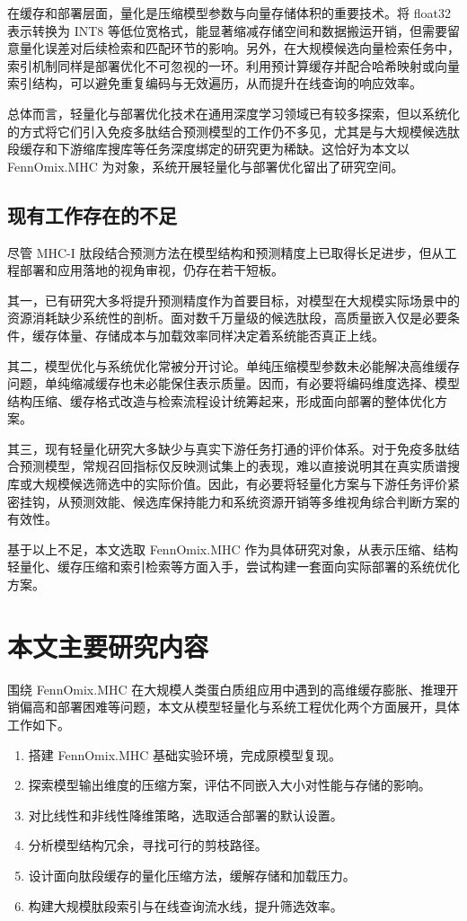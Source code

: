 在缓存和部署层面，量化是压缩模型参数与向量存储体积的重要技术。将 float32 表示转换为 INT8 等低位宽格式，能显著缩减存储空间和数据搬运开销，但需要留意量化误差对后续检索和匹配环节的影响。另外，在大规模候选向量检索任务中，索引机制同样是部署优化不可忽视的一环。利用预计算缓存并配合哈希映射或向量索引结构，可以避免重复编码与无效遍历，从而提升在线查询的响应效率。

总体而言，轻量化与部署优化技术在通用深度学习领域已有较多探索，但以系统化的方式将它们引入免疫多肽结合预测模型的工作仍不多见，尤其是与大规模候选肽段缓存和下游缩库搜库等任务深度绑定的研究更为稀缺。这恰好为本文以 FennOmix.MHC 为对象，系统开展轻量化与部署优化留出了研究空间。

\subsection{现有工作存在的不足}
尽管 MHC-I 肽段结合预测方法在模型结构和预测精度上已取得长足进步，但从工程部署和应用落地的视角审视，仍存在若干短板。

其一，已有研究大多将提升预测精度作为首要目标，对模型在大规模实际场景中的资源消耗缺少系统性的剖析。面对数千万量级的候选肽段，高质量嵌入仅是必要条件，缓存体量、存储成本与加载效率同样决定着系统能否真正上线。

其二，模型优化与系统优化常被分开讨论。单纯压缩模型参数未必能解决高维缓存问题，单纯缩减缓存也未必能保住表示质量。因而，有必要将编码维度选择、模型结构压缩、缓存格式改造与检索流程设计统筹起来，形成面向部署的整体优化方案。

其三，现有轻量化研究大多缺少与真实下游任务打通的评价体系。对于免疫多肽结合预测模型，常规召回指标仅反映测试集上的表现，难以直接说明其在真实质谱搜库或大规模候选筛选中的实际价值。因此，有必要将轻量化方案与下游任务评价紧密挂钩，从预测效能、候选库保持能力和系统资源开销等多维视角综合判断方案的有效性。

基于以上不足，本文选取 FennOmix.MHC 作为具体研究对象，从表示压缩、结构轻量化、缓存压缩和索引检索等方面入手，尝试构建一套面向实际部署的系统优化方案。

\section{本文主要研究内容}

围绕 FennOmix.MHC 在大规模人类蛋白质组应用中遇到的高维缓存膨胀、推理开销偏高和部署困难等问题，本文从模型轻量化与系统工程优化两个方面展开，具体工作如下。

\begin{enumerate}[label=（\arabic*）, leftmargin=5em, itemsep=0pt, topsep=0pt]
    \item 搭建 FennOmix.MHC 基础实验环境，完成原模型复现。
    \item 探索模型输出维度的压缩方案，评估不同嵌入大小对性能与存储的影响。
    \item 对比线性和非线性降维策略，选取适合部署的默认设置。
    \item 分析模型结构冗余，寻找可行的剪枝路径。
    \item 设计面向肽段缓存的量化压缩方法，缓解存储和加载压力。
    \item 构建大规模肽段索引与在线查询流水线，提升筛选效率。
\end{enumerate}

